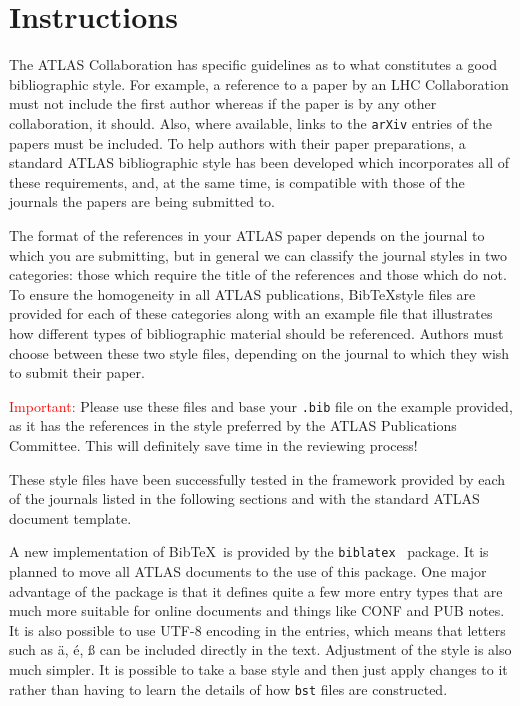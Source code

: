 \documentclass[UKenglish]{style/atlasdoc}
\author{Ian C. Brock}
\newcommand*{\BibTeX}{Bib\TeX}
\begin{document}
 

\maketitle

\section{Instructions}

The ATLAS Collaboration has specific guidelines as to what constitutes a good bibliographic style. 
For example, a reference to a paper by an LHC Collaboration must not include the first author whereas if the paper is by any other collaboration, it should. 
Also, where available, links to the \texttt{arXiv} entries of the papers must be included. 
To help authors with their paper preparations, a standard ATLAS bibliographic style has been developed which incorporates all of these requirements, 
and, at the same time, is compatible with those of the journals the papers are being submitted to. 

The format of the references in your ATLAS paper depends on the journal to which you are submitting,
but in general we can classify the journal styles in two categories: those which require the title of the references and those which do not. 
To ensure the homogeneity in all ATLAS publications, 
\BibTeX style files are provided for each of these categories along with an example file that illustrates how different types of bibliographic material should be referenced.
Authors must choose between these two style files, depending on the journal to which they wish to submit their paper.

\textcolor{red}{Important:} Please use these files and base your \texttt{.bib} file on the example provided,
as it has the references in the style preferred by the ATLAS Publications Committee.
This will definitely save time in the reviewing process!

These style files have been successfully tested in the framework provided by each of the journals listed in the following sections and with the standard ATLAS document template.

A new implementation of \BibTeX\ is provided by the \texttt{biblatex}~\cite{biblatex} package.
It is planned to move all ATLAS documents to the use of this package.
One major advantage of the package is that it defines quite a few more entry types
that are much more suitable for online documents and things like CONF and PUB notes.
It is also possible to use UTF-8 encoding in the entries, which means that letters such as
ä, é, ß can be included directly in the text.
Adjustment of the style is also much simpler.
It is possible to take a base style and then just apply changes to it rather than
having to learn the details of how \texttt{bst} files are constructed.
\end{document}
